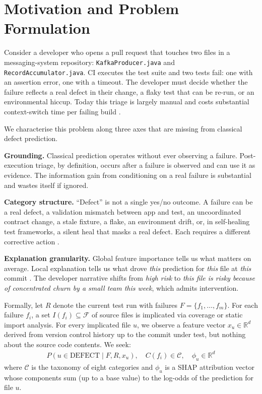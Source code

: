 \documentclass[conference]{IEEEtran}
\begin{document}
\section{Motivation and Problem Formulation}
\label{sec:motivation}

Consider a developer who opens a pull request that touches two files in a messaging-system repository: \texttt{KafkaProducer.java} and \texttt{RecordAccumulator.java}. CI executes the test suite and two tests fail: one with an assertion error, one with a timeout. The developer must decide whether the failure reflects a real defect in their change, a flaky test that can be re-run, or an environmental hiccup. Today this triage is largely manual and costs substantial context-switch time per failing build \cite{Mockus2000,McIntosh2016}.

We characterise this problem along three axes that are missing from classical defect prediction.

\textbf{Grounding.} Classical prediction operates without ever observing a failure. Post-execution triage, by definition, occurs after a failure is observed and can use it as evidence. The information gain from conditioning on a real failure is substantial and wastes itself if ignored.

\textbf{Category structure.} ``Defect'' is not a single yes/no outcome. A failure can be a real defect, a validation mismatch between app and test, an uncoordinated contract change, a stale fixture, a flake, an environment drift, or, in self-healing test frameworks, a silent heal that masks a real defect. Each requires a different corrective action \cite{Herzig2015}.

\textbf{Explanation granularity.} Global feature importance tells us what matters on average. Local explanation tells us what drove \textit{this} prediction for \textit{this} file at \textit{this} commit \cite{Lundberg2017}. The developer narrative shifts from \textit{high risk} to \textit{this file is risky because of concentrated churn by a small team this week}, which admits intervention.

Formally, let $R$ denote the current test run with failures $F = \{f_1, \ldots, f_m\}$. For each failure $f_i$, a set $I(f_i) \subseteq \mathcal{F}$ of source files is implicated via coverage or static import analysis. For every implicated file $u$, we observe a feature vector $x_u \in \mathbb{R}^{d}$ derived from version control history up to the commit under test, but nothing about the source code contents. We seek:
\begin{align*}
P(u \in \text{DEFECT} \mid F, R, x_u), \quad
C(f_i) \in \mathcal{C}, \quad
\phi_u \in \mathbb{R}^{d}
\end{align*}
where $\mathcal{C}$ is the taxonomy of eight categories and $\phi_u$ is a SHAP attribution vector whose components sum (up to a base value) to the log-odds of the prediction for file $u$.
\end{document}
